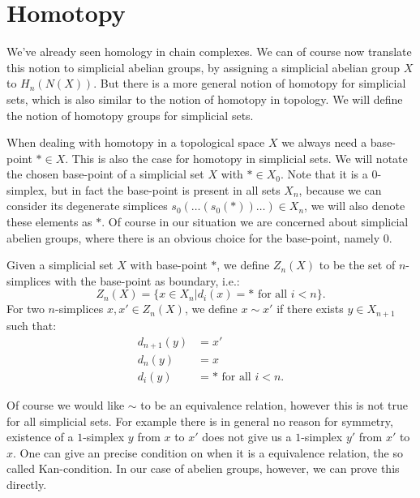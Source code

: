 \section{Homotopy}
\label{sec:Homotopy}

We've already seen homology in chain complexes. We can of course now translate this notion to simplicial abelian groups, by assigning a simplicial abelian group $X$ to $H_n(N(X))$. But there is a more general notion of homotopy for simplicial sets, which is also similar to the notion of homotopy in topology. We will define the notion of homotopy groups for simplicial sets.

When dealing with homotopy in a topological space $X$ we always need a base-point $\ast \in X$. This is also the case for homotopy in simplicial sets. We will notate the chosen base-point of a simplicial set $X$ with $\ast \in X_0$. Note that it is a $0$-simplex, but in fact the base-point is present in all sets $X_n$, because we can consider its degenerate simplices $s_0(\ldots(s_0(\ast))\ldots) \in X_n$, we will also denote these elements as $\ast$. Of course in our situation we are concerned about simplicial abelien groups, where there is an obvious choice for the base-point, namely $0$.

\begin{definition}
	Given a simplicial set $X$ with base-point $\ast$, we define $Z_n(X)$ to be the set of $n$-simplices with the base-point as boundary, i.e.:
	$$ Z_n(X) = \{ x \in X_n | d_i(x) = \ast \text{ for all } i < n \}. $$
	For two $n$-simplices $x, x' \in Z_n(X)$, we define $x \sim x'$ if there exists $y \in X_{n+1}$ such that:
	\begin{align}
		d_{n+1}(y) &= x' \\
		d_n(y) &= x \\
		d_i(y) &= \ast \text{ for all } i < n.
	\end{align}
\end{definition}

Of course we would like $\sim$ to be an equivalence relation, however this is not true for all simplicial sets. For example there is in general no reason for symmetry, existence of a $1$-simplex $y$ from $x$ to $x'$ does not give us a $1$-simplex $y'$ from $x'$ to $x$. One can give an precise condition on when it is a equivalence relation, the so called Kan-condition. In our case of abelien groups, however, we can prove this directly.


